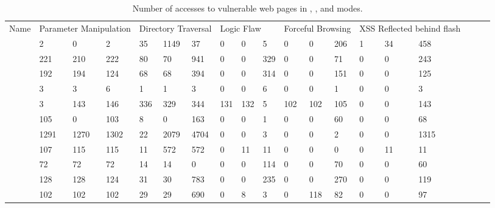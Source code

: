 \begin{table*}[t]
{\begin{tabular}{|l|p{8ex}p{8ex}p{10ex}|p{4ex}p{4ex}p{5ex}|p{4ex}p{4ex}p{5ex}|p{4ex}p{4ex}p{5ex}|p{4ex}p{4ex}p{5ex}|p{4ex}p{4ex}p{5ex}|}
          \hline
          Name & \multicolumn{3}{|c|}{Parameter Manipulation} & \multicolumn{3}{|p{14ex}|}{Directory Traversal} & \multicolumn{3}{|p{14ex}|}{Logic Flaw} & \multicolumn{3}{|p{14ex}|}{Forceful Browsing} & \multicolumn{3}{|p{14ex}|}{XSS Reflected behind flash} & & & \\
          \acunetix{} & 2&0&2   & 35&1149&37   & 0&0&5   & 0&0&206   & 1&34&458 & & & \\
          \appscan{} & 221&210&222   & 80&70&941   & 0&0&329   & 0&0&71   & 0&0&243 & & & \\
          \burp{} & 192&194&124   & 68&68&394   & 0&0&314   & 0&0&151   & 0&0&125 & & & \\
          \grendelscan{} & 3&3&6   & 1&1&3   & 0&0&6   & 0&0&1   & 0&0&3 & & & \\
          \hailstorm{} & 3&143&146   & 336&329&344   & 131&132&5   & 102&102&105   & 0&0&143 & & & \\
          \milescan{} & 105&0&103   & 8&0&163   & 0&0&1   & 0&0&60   & 0&0&68   & & & \\
          \nstalker{} & 1291&1270&1302   & 22&2079&4704   & 0&0&3   & 0&0&2   & 0&0&1315 & & & \\
          \ntospider{} & 107&115&115   & 11&572&572   & 0&11&11   & 0&0&0   & 0&11&11 & & & \\
          \paros{} & 72&72&72   & 14&14&0   & 0&0&114   & 0&0&70   & 0&0&60 & & & \\
          \waf{} & 128&128&124   & 31&30&783   & 0&0&235   & 0&0&270   & 0&0&119 & & & \\
          \webinspect{} & 102&102&102   & 29&29&690   & 0&8&3   & 0&118&82   & 0&0&97 & & & \\
          \hline
        \end{tabular}}
        \caption{Number of accesses to vulnerable web pages in \initial{}, \config{}, and \manual{} modes.}
  \end{table*}




